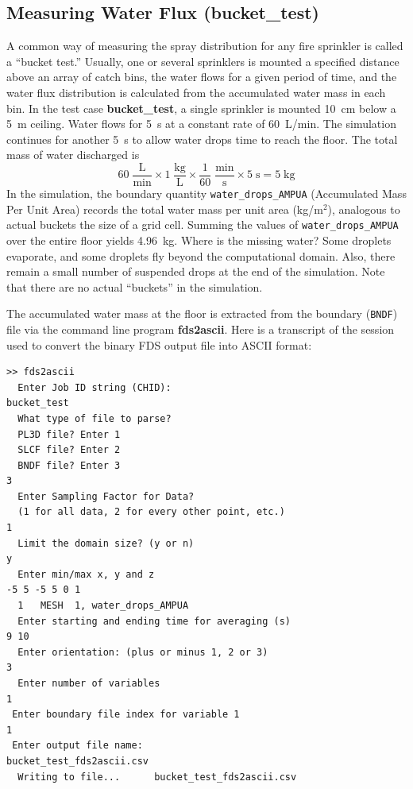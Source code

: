 \documentclass[11pt]{book}
\newcommand{\ct}{\tt\small}
\newcommand{\be}{\begin{equation}}
\newcommand{\ee}{\end{equation}}
\begin{document}
\clearpage

\subsection{Measuring Water Flux ({\bf bucket\_test}) }
\label{bucket_test}

A common way of measuring the spray distribution for any fire sprinkler is called a ``bucket test.''  Usually, one or several sprinklers is
mounted a specified distance above an array of catch bins, the water flows for a given period of time, and the water flux distribution is calculated
from the accumulated water mass in each bin. In the test case {\bf bucket\_test}, a single sprinkler is mounted 10~cm below a 5~m ceiling. Water
flows for 5~s at a constant rate of 60~L/min.  The simulation continues for another 5~s to allow water drops time to reach the
floor. The total mass of water discharged is
\be
  \mathrm{ 60 \; \frac{L}{min} \times 1 \; \frac{kg}{L} \times \frac{1}{60} \; \frac{min}{s} \times 5 \; s = 5 \; kg }
\ee
In the simulation, the boundary quantity {\ct water\_drops\_AMPUA} (Accumulated Mass Per Unit Area) records the total water mass per unit area (kg/m$^2$), analogous to
actual buckets the size of a grid cell.
Summing the values of {\ct water\_drops\_AMPUA} over the entire floor yields 4.96~kg. Where is the missing water? Some droplets evaporate, and some droplets
fly beyond the computational domain. Also, there remain a small number of suspended drops at the end of the simulation. Note that
there are no actual ``buckets'' in the simulation.

The accumulated water mass at the floor is extracted from the boundary ({\ct BNDF}) file via the command line program {\bf fds2ascii}. Here is a transcript of the session
used to convert the binary FDS output file into ASCII format:

\footnotesize
\begin{verbatim}
>> fds2ascii
  Enter Job ID string (CHID):
bucket_test
  What type of file to parse?
  PL3D file? Enter 1
  SLCF file? Enter 2
  BNDF file? Enter 3
3
  Enter Sampling Factor for Data?
  (1 for all data, 2 for every other point, etc.)
1
  Limit the domain size? (y or n)
y
  Enter min/max x, y and z
-5 5 -5 5 0 1
  1   MESH  1, water_drops_AMPUA
  Enter starting and ending time for averaging (s)
9 10
  Enter orientation: (plus or minus 1, 2 or 3)
3
  Enter number of variables
1
 Enter boundary file index for variable 1
1
 Enter output file name:
bucket_test_fds2ascii.csv
  Writing to file...      bucket_test_fds2ascii.csv
\end{verbatim}
\end{document}
